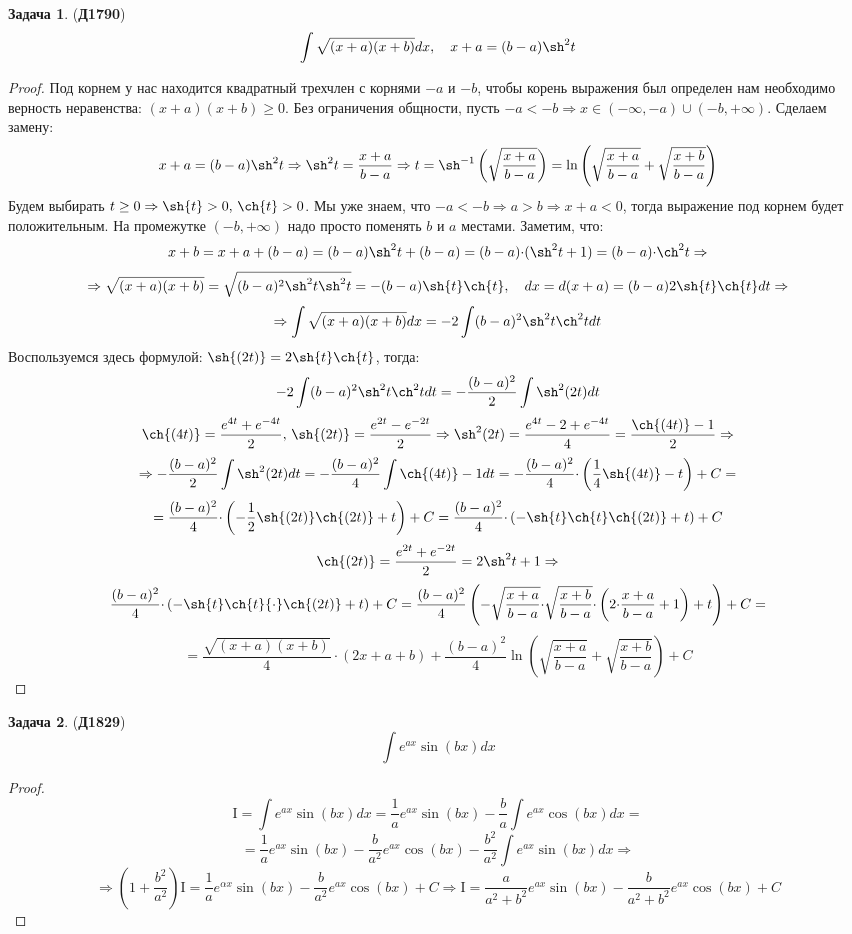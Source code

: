 \documentclass[12pt]{article}
\newcommand{\MI}{\mathrm{I}}
\theoremstyle{definition}
\newtheorem{problem}{Задача}
\DeclareMathOperator{\dint}{\displaystyle\int}
\begin{document}
\newpage
\begin{problem}(\textbf{Д1790})
	$$
		\dint \sqrt{(x+a)(x+b)}dx,\quad x + a = (b-a)\sh^2{t}
	$$
\end{problem}
\begin{proof}
	Под корнем у нас находится квадратный трехчлен с корнями $-a$ и $-b$, чтобы корень выражения был определен нам необходимо верность неравенства: $(x+a)(x+b) \geq  0$. Без ограничения общности, пусть $-a < -b \Rightarrow x \in (-\infty,-a)\cup (-b, + \infty)$. 	
	Сделаем замену: 
	$$
		x+ a = (b-a)\sh^2{t} \Rightarrow \sh^2{t} = \dfrac{x + a}{b-a} \Rightarrow t =\sh^{-1}\left(\sqrt{\dfrac{x+a}{b-a}}\right) = \ln{\left(\sqrt{\dfrac{x+a}{b-a}} + \sqrt{\dfrac{x+b}{b-a}}\right)}
	$$ 
	Будем выбирать $t \geq 0 \Rightarrow \sh{t} > 0, \, \ch{t} > 0$. Мы уже знаем, что $-a < -b \Rightarrow a >  b \Rightarrow x + a < 0$, тогда выражение под корнем будет положительным. На промежутке $(-b,+\infty)$ надо просто поменять $b$ и $a$ местами. Заметим, что:
	$$
		x + b = x + a + (b - a) = (b-a)\sh^2{t} + (b-a) = (b-a){\cdot}(\sh^2{t} + 1) = (b-a){\cdot}\ch^2{t} \Rightarrow
	$$
	$$
		\Rightarrow \sqrt{(x+a)(x+b)} = \sqrt{(b-a)^2\sh^2{t}\sh^2{t}} = -(b-a)\sh{t}\ch{t}, \quad dx = d(x + a) = (b-a)2\sh{t}\ch{t}dt \Rightarrow
	$$
	$$
		\Rightarrow  \dint \sqrt{(x+a)(x+b)}dx = -2\dint (b-a)^2 \sh^2{t}\ch^2{t}dt
	$$
	Воспользуемся здесь формулой: $\sh{(2t)} = 2\sh{t}\ch{t}$, тогда:
	$$
		-2\dint (b-a)^2 \sh^2{t}\ch^2{t}dt = -\dfrac{(b-a)^2}{2}\dint \sh^2{(2t)}dt 
	$$
	$$
		\ch{(4t)} = \dfrac{e^{4t} + e^{-4t}}{2}, \, \sh{(2t)} = \dfrac{e^{2t} - e^{-2t}}{2} \Rightarrow \sh^2{(2t)} = \dfrac{e^{4t} -2 + e^{-4t}}{4} = \dfrac{\ch{(4t)} - 1}{2} \Rightarrow
	$$
	$$
		\Rightarrow -\dfrac{(b-a)^2}{2}\dint \sh^2{(2t)}dt = -\dfrac{(b-a)^2}{4}\dint \ch{(4t)} - 1 dt = -\dfrac{(b-a)^2}{4}{\cdot}\left(\dfrac{1}{4}\sh{(4t)} - t\right) + C =
	$$
	$$
		=	\dfrac{(b-a)^2}{4}{\cdot}\left(-\dfrac{1}{2}\sh{(2t)}\ch{(2t)} + t\right) + C = \dfrac{(b-a)^2}{4}{\cdot}\left(-\sh{t}\ch{t}\ch{(2t)} + t\right) + C
	$$
	$$
		\ch{(2t)} = \dfrac{e^{2t} + e^{-2t}}{2} = 2\sh^2{t} + 1  \Rightarrow
	$$
	$$
		\dfrac{(b-a)^2}{4}{\cdot}\left(-\sh{t}\ch{t}{\cdot}\ch{(2t)} + t\right) + C =	\dfrac{(b-a)^2}{4}\left(-\sqrt{\dfrac{x+a}{b-a}}{\cdot}\sqrt{\dfrac{x + b}{b-a}}{\cdot}\left( 2{\cdot}\dfrac{x+a}{b-a} + 1\right) +t \right) +C = 
	$$
	$$
		=	\dfrac{\sqrt{(x+a)(x+b)}}{4}{\cdot}(2x + a + b) + \dfrac{(b-a)^2}{4}\ln{\left(\sqrt{\dfrac{x+a}{b-a}} + \sqrt{\dfrac{x+b}{b-a}}\right)} +C
	$$
\end{proof}
\newpage
\begin{problem}(\textbf{Д1829})
	$$
		\dint e^{a x}\sin{(bx)}dx
	$$
\end{problem}
\begin{proof}
	$$
		\MI = \dint e^{a x}\sin{(bx)}dx = \dfrac{1}{a}e^{a x}\sin{(bx)} - \dfrac{b}{a}\dint e^{a x} \cos{(bx)}dx = 
	$$
	$$	
		= \dfrac{1}{a}e^{a x}\sin{(bx)} - \dfrac{b}{a^2}e^{a x} \cos{(bx)} - \dfrac{b^2}{a^2}\dint e^{a x}\sin{(bx)}dx \Rightarrow
	$$
	$$
		\Rightarrow \left(1 + \dfrac{b^2}{a^2}\right)\MI = \dfrac{1}{a}e^{\alpha x}\sin{(bx)} - \dfrac{b}{a^2}e^{a x} \cos{(bx)} +C \Rightarrow \MI = \dfrac{a}{a^2 + b^2}e^{a x}\sin{(bx)} - \dfrac{b}{a^2 + b^2}e^{a x}\cos{(bx)} + C
	$$
\end{proof}
		
\end{document}
